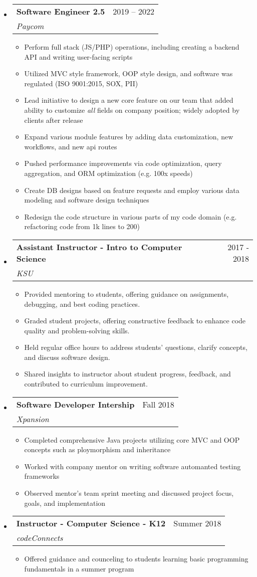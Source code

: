 \documentclass[letterpaper,11pt]{article}
\makeatletter
\newcommand{\resumeItem}[1]{
  \item\small{
    {#1 \vspace{-2pt}}
  }
}
\newcommand{\resumeSubheading}[4]{
  \vspace{-2pt}\item
    \begin{tabular*}{0.97\textwidth}[t]{l@{\extracolsep{\fill}}r}
      \textbf{#1} & #2 \\
      \textit{\small#3} & \textit{\small #4} \\
    \end{tabular*}\vspace{0pt}
}
\newcommand{\resumeSubHeadingListStart}{\begin{itemize}[leftmargin=0.15cm, label={}]}
\newcommand{\resumeSubHeadingListEnd}{\end{itemize}}
\newcommand{\resumeItemListStart}{\begin{itemize}}
\newcommand{\resumeItemListEnd}{\end{itemize}\vspace{-5pt}}
\makeatother
\begin{document}
\resumeSubHeadingListStart
\resumeSubheading
{Software Engineer 2.5}{2019 – 2022}
{Paycom}{}
\resumeItemListStart
\resumeItem{Perform full stack (JS/PHP) operations, including creating a backend API and writing user-facing scripts}
\resumeItem{Utilized MVC style framework, OOP style design, and software was regulated (ISO 9001:2015, SOX, PII)}
\resumeItem{Lead initiative to design a new core feature on our team that added ability to customize \textit{all} fields on company position; widely adopted by clients after release }
\resumeItem{Expand various module features by adding data customization, new workflows, and new api routes}
\resumeItem{Pushed performance improvements via code optimization, query aggregation, and ORM optimization (e.g. 100x speeds)}
\resumeItem{Create DB designs based on feature requests and employ various data modeling and software design techniques}
\resumeItem{Redesign the code structure in various parts of my code domain (e.g. refactoring code from 1k lines to 200)}
\resumeItemListEnd
\resumeSubHeadingListEnd

\resumeSubHeadingListStart
\resumeSubheading
{Assistant Instructor - Intro to Computer Science}{2017 - 2018}
{KSU}{}
\resumeItemListStart
\resumeItem{ Provided mentoring to students, offering guidance on assignments, debugging, and best coding practices. }
\resumeItem{ Graded student projects, offering constructive feedback to enhance code quality and problem-solving skills. }
\resumeItem{ Held regular office hours to address students' questions, clarify concepts, and discuss software design. }
\resumeItem{ Shared insights to instructor about student progress, feedback, and contributed to curriculum improvement. }
\resumeItemListEnd
\resumeSubHeadingListEnd

\resumeSubHeadingListStart
\resumeSubheading
{Software Developer Intership}{Fall 2018}
{Xpansion}{}
\resumeItemListStart
\resumeItem{ Completed comprehensive Java projects utilizing core MVC and OOP concepts such as ploymorphism and inheritance }
\resumeItem{ Worked with company mentor on writing software automanted testing frameworks }
\resumeItem{ Observed mentor's team sprint meeting and discussed project focus, goals, and implementation }
\resumeItemListEnd
\resumeSubHeadingListEnd

\resumeSubHeadingListStart
\resumeSubheading
{Instructor - Computer Science - K12}{Summer 2018}
{codeConnects}{}
\resumeItemListStart
\resumeItem{ Offered guidance and counceling to students learning basic programming fundamentals in a summer program }
\resumeItemListEnd
\resumeSubHeadingListEnd
\end{document}
